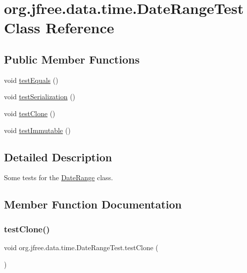 \hypertarget{classorg_1_1jfree_1_1data_1_1time_1_1_date_range_test}{}\section{org.\+jfree.\+data.\+time.\+Date\+Range\+Test Class Reference}
\label{classorg_1_1jfree_1_1data_1_1time_1_1_date_range_test}
\subsection*{Public Member Functions}
\begin{DoxyCompactItemize}
\item 
void \mbox{\hyperlink{classorg_1_1jfree_1_1data_1_1time_1_1_date_range_test_aaa0393a887e748008e1f3d539e0340b8}{test\+Equals}} ()
\item 
void \mbox{\hyperlink{classorg_1_1jfree_1_1data_1_1time_1_1_date_range_test_ade0a95d39c6a58c26be460c6f76d9bfa}{test\+Serialization}} ()
\item 
void \mbox{\hyperlink{classorg_1_1jfree_1_1data_1_1time_1_1_date_range_test_a645b7dd4a8773e19c55141617a99eb3f}{test\+Clone}} ()
\item 
void \mbox{\hyperlink{classorg_1_1jfree_1_1data_1_1time_1_1_date_range_test_ac95ac44465699100d8bd66bb74f1dae4}{test\+Immutable}} ()
\end{DoxyCompactItemize}


\subsection{Detailed Description}
Some tests for the \mbox{\hyperlink{classorg_1_1jfree_1_1data_1_1time_1_1_date_range}{Date\+Range}} class. 

\subsection{Member Function Documentation}
\mbox{\label{classorg_1_1jfree_1_1data_1_1time_1_1_date_range_test_a645b7dd4a8773e19c55141617a99eb3f}} 
\subsubsection{\texorpdfstring{test\+Clone()}{testClone()}}
{\footnotesize\ttfamily void org.\+jfree.\+data.\+time.\+Date\+Range\+Test.\+test\+Clone (\begin{DoxyParamCaption}{ }\end{DoxyParamCaption})}

